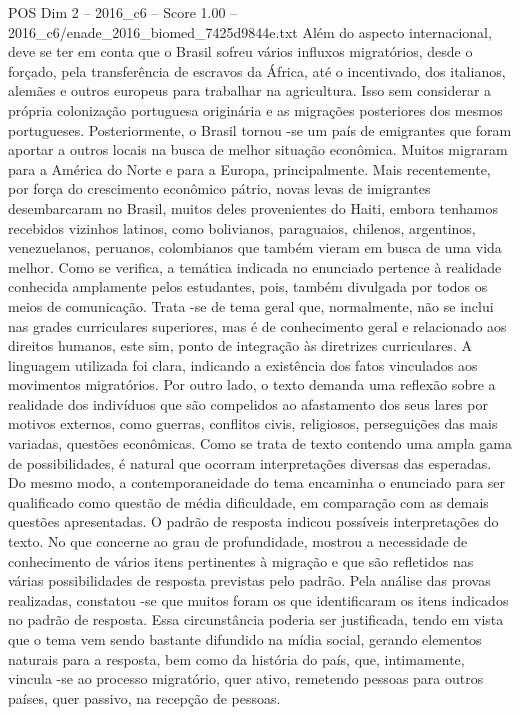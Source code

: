 \begin{textsample}{POS Dim 2 – 2016\_c6 – Score 1.00 – 2016\_c6/enade\_2016\_biomed\_7425d9844e.txt}
Além do aspecto internacional, deve se ter em conta que o Brasil sofreu vários influxos migratórios, desde o forçado, pela transferência de escravos da África, até o incentivado, dos italianos, alemães e outros europeus para trabalhar na agricultura.
Isso sem considerar a própria colonização portuguesa originária e as migrações posteriores dos mesmos portugueses.
Posteriormente, o Brasil tornou -se um país de emigrantes que foram aportar a outros locais na busca de melhor situação econômica.
Muitos migraram para a América do Norte e para a Europa, principalmente.
Mais recentemente, por força do crescimento econômico pátrio, novas levas de imigrantes desembarcaram no Brasil, muitos deles provenientes do Haiti, embora tenhamos recebidos vizinhos latinos, como bolivianos, paraguaios, chilenos, argentinos, venezuelanos, peruanos, colombianos que também vieram em busca de uma vida melhor.
Como se verifica, a temática indicada no enunciado pertence à realidade conhecida amplamente pelos estudantes, pois, também divulgada por todos os meios de comunicação.
Trata -se de tema geral que, normalmente, não se inclui nas grades curriculares superiores, mas é de conhecimento geral e relacionado aos direitos humanos, este sim, ponto de integração às diretrizes curriculares.
A linguagem utilizada foi clara, indicando a existência dos fatos vinculados aos movimentos migratórios.
Por outro lado, o texto demanda uma reflexão sobre a realidade dos indivíduos que são compelidos ao afastamento dos seus lares por motivos externos, como guerras, conflitos civis, religiosos, perseguições das mais variadas, questões econômicas.
Como se trata de texto contendo uma ampla gama de possibilidades, é natural que ocorram interpretações diversas das esperadas.
Do mesmo modo, a contemporaneidade do tema encaminha o enunciado para ser qualificado como questão de média dificuldade, em comparação com as demais questões apresentadas.
O padrão de resposta indicou possíveis interpretações do texto.
No que concerne ao grau de profundidade, mostrou a necessidade de conhecimento de vários itens pertinentes à migração e que são refletidos nas várias possibilidades de resposta previstas pelo padrão.
Pela análise das provas realizadas, constatou -se que muitos foram os que identificaram os itens indicados no padrão de resposta.
Essa circunstância poderia ser justificada, tendo em vista que o tema vem sendo bastante difundido na mídia social, gerando elementos naturais para a resposta, bem como da história do país, que, intimamente, vincula -se ao processo migratório, quer ativo, remetendo pessoas para outros países, quer passivo, na recepção de pessoas.

\end{textsample}
